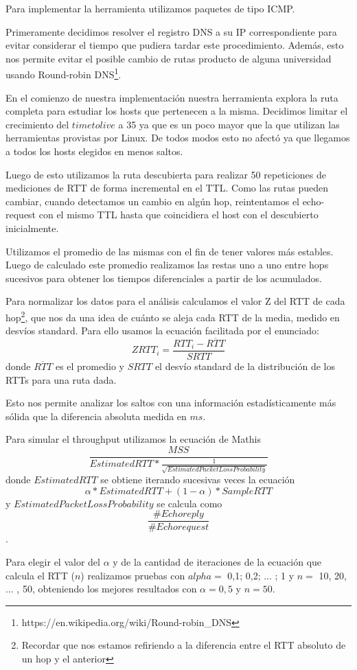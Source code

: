 Para implementar la herramienta utilizamos paquetes de tipo ICMP.

Primeramente decidimos resolver el registro DNS a su IP correspondiente para evitar considerar el tiempo que pudiera tardar este procedimiento. Además, esto nos permite evitar el posible cambio de rutas producto de alguna universidad usando Round-robin DNS\footnote{https://en.wikipedia.org/wiki/Round-robin\_DNS}.

En el comienzo de nuestra implementación nuestra herramienta explora la ruta completa para estudiar los hosts que pertenecen a la misma.
Decidimos limitar el crecimiento del $time to live$ a 35 ya que es un poco mayor que la que utilizan las herramientas provistas por Linux.
De todos modos esto no afectó ya que llegamos a todos los hosts elegidos en menos saltos.

Luego de esto utilizamos la ruta descubierta para realizar 50 repeticiones de mediciones de RTT de forma incremental en el TTL.
Como las rutas pueden cambiar, cuando detectamos un cambio en algún hop, reintentamos el echo-request con el mismo TTL hasta que coincidiera el host con el descubierto inicialmente.

Utilizamos el promedio de las mismas con el fin de tener valores más estables.
Luego de calculado este promedio realizamos las restas uno a uno entre hops sucesivos para obtener los tiempos diferenciales a partir de los acumulados.

Para normalizar los datos para el análisis calculamos el valor Z del RTT de cada hop\footnote{Recordar que nos estamos refiriendo a la diferencia entre el RTT absoluto de un hop y el anterior}, que nos da una idea de cuánto se aleja cada RTT de la media, medido en desvíos standard. Para ello usamos la ecuación facilitada por el enunciado: $$ ZRTT_i = \dfrac{RTT_i-\overline{RTT}}{SRTT}$$ donde $\overline{RTT}$ es el promedio y $SRTT$ el desvío standard de la distribución de los RTTs para una ruta dada.

Esto nos permite analizar los saltos con una información estadísticamente más sólida que la diferencia absoluta medida en $ms$.

Para simular el throughput utilizamos la ecuación de Mathis
$$\frac{MSS}{EstimatedRTT * \frac{1}{\sqrt{EstimatedPacketLossProbability}}}$$
donde $EstimatedRTT$ se obtiene iterando sucesivas veces la ecuación
$$\alpha * EstimatedRTT + (1 - \alpha) * SampleRTT$$
y $EstimatedPacketLossProbability$ se calcula como $$\frac{\#Echo reply}{\#Echo request}$$.

Para elegir el valor del $\alpha$ y de la cantidad de iteraciones de la ecuación que calcula el RTT ($n$) realizamos pruebas con $alpha =$ 0,1; 0,2; ... ; 1 y $n =$ 10, 20, ... , 50, obteniendo los mejores resultados con $\alpha = 0,5$ y $n = 50$.
